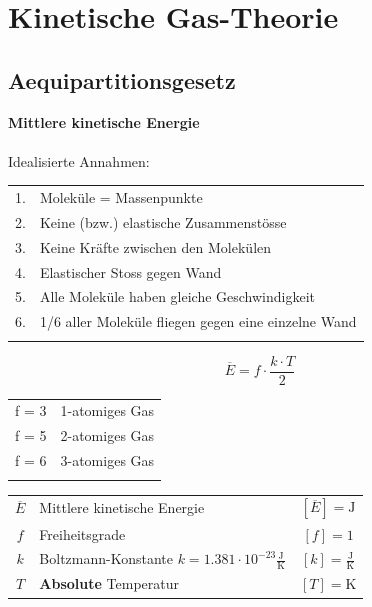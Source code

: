 \vfill\null
\columnbreak


\section{Kinetische Gas-Theorie}

\subsection{Aequipartitionsgesetz}

\textbf{Mittlere kinetische Energie} \\
\\
Idealisierte Annahmen: \\

\begin{tabular}{ll}
1. & Moleküle = Massenpunkte \\
2. & Keine (bzw.) elastische Zusammenstösse \\
3. & Keine Kräfte zwischen den Molekülen\\
4. & Elastischer Stoss gegen Wand \\
5. & Alle Moleküle haben gleiche Geschwindigkeit \\
6. & 1/6 aller Moleküle fliegen gegen eine einzelne Wand \\
\\
\end{tabular}


\begin{minipage}{0.48\linewidth}
$$ \boxed{ \overline{E} = f \cdot \frac{k \cdot T}{2} } $$
\end{minipage}
\hfill
\begin{minipage}{0.48\linewidth}
\begin{tabular}{ll}
f = 3 & 1-atomiges Gas \\
f = 5 & 2-atomiges Gas \\
f = 6 & 3-atomiges Gas \\
\\
\end{tabular}
\end{minipage}


\begin{tabular}{c l c}
	$\overline{E}$ & Mittlere kinetische Energie & $[\overline{E}] = \mathrm{J}$ \\
	$f$ & Freiheitsgrade & $[f] = \text{1}$ \\
	\rule{0pt}{8pt}$k$ & Boltzmann-Konstante $k = 1.381 \cdot 10^{-23} \mathrm{\frac{J}{K}}$ & $[k] = \mathrm{\frac{J}{K}}$ \\
	$T$ & \textbf{Absolute} Temperatur & $[T] = \mathrm{K}$ \\	
\end{tabular}


